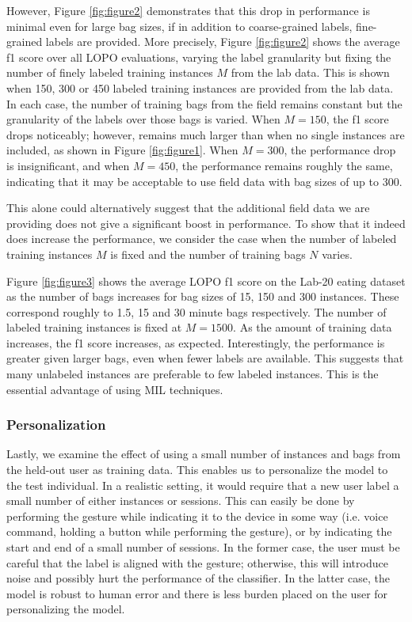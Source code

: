 \documentclass{sigchi}
\begin{document}
However, Figure \ref{fig:figure2} demonstrates that this drop in performance is minimal even for large bag sizes, if in addition to coarse-grained labels, fine-grained labels are provided. More precisely, Figure \ref{fig:figure2} shows the average f1 score over all LOPO evaluations, varying the label granularity but fixing the number of finely labeled training instances $M$ from the lab data. This is shown when 150, 300 or 450 labeled training instances are provided from the lab data. In each case, the number of training bags from the field remains constant but the granularity of the labels over those bags is varied. When $M = 150$, the f1 score drops noticeably; however, remains much larger than when no single instances are included, as shown in Figure \ref{fig:figure1}. When $M = 300$, the performance drop is insignificant, and when $M = 450$, the performance remains roughly the same, indicating that it may be acceptable to use field data with bag sizes of up to 300.

This alone could alternatively suggest that the additional field data we are providing does not give a significant boost in performance. To show that it indeed does increase the performance, we consider the case when the number of labeled training instances $M$ is fixed and the number of training bags $N$ varies.

Figure \ref{fig:figure3} shows the average LOPO f1 score on the Lab-20 eating dataset as the number of bags increases for bag sizes of 15, 150 and 300 instances. These correspond roughly to 1.5, 15 and 30 minute bags respectively. The number of labeled training instances is fixed at $M = 1500$. As the amount of training data increases, the f1 score increases, as expected. Interestingly, the performance is greater given larger bags, even when fewer labels are available. This suggests that many unlabeled instances are preferable to few labeled instances. This is the essential advantage of using MIL techniques.

\subsubsection{Personalization}

Lastly, we examine the effect of using a small number of instances and bags from the held-out user as training data. This enables us to personalize the model to the test individual. In a realistic setting, it would require that a new user label a small number of either instances or sessions. This can easily be done by performing the gesture while indicating it to the device in some way (i.e. voice command, holding a button while performing the gesture), or by indicating the start and end of a small number of sessions. In the former case, the user must be careful that the label is aligned with the gesture; otherwise, this will introduce noise and possibly hurt the performance of the classifier. In the latter case, the model is robust to human error and there is less burden placed on the user for personalizing the model.
\end{document}
